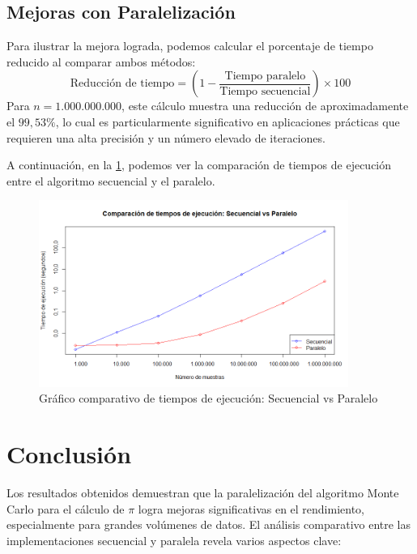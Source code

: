 \documentclass[a4paper, 10pt, onecolumn]{IEEEtran}
\begin{document}
\subsection{Mejoras con Paralelización}
Para ilustrar la mejora lograda, podemos calcular el porcentaje de tiempo reducido al comparar ambos métodos:
\[
\text{Reducción de tiempo} = \left(1 - \frac{\text{Tiempo paralelo}}{\text{Tiempo secuencial}}\right) \times 100
\]
Para $n = 1.000.000.000$, este cálculo muestra una reducción de aproximadamente el $99,53\%$, lo cual es particularmente significativo en aplicaciones prácticas que requieren una alta precisión y un número elevado de iteraciones.

A continuación, en la \cref{fig:efficiency}, podemos ver la comparación de tiempos de ejecución entre el algoritmo secuencial y el paralelo.

\begin{figure}[H]
  \centering
  \includegraphics[width=0.9\textwidth]{./img/efficiency.png}
  \caption{Gráfico comparativo de tiempos de ejecución: Secuencial vs Paralelo}
  \label{fig:efficiency}
\end{figure}

\section{Conclusión}
Los resultados obtenidos demuestran que la paralelización del algoritmo Monte Carlo para el cálculo de $\pi$ logra mejoras significativas en el rendimiento, especialmente para grandes volúmenes de datos. El análisis comparativo entre las implementaciones secuencial y paralela revela varios aspectos clave:
\end{document}
